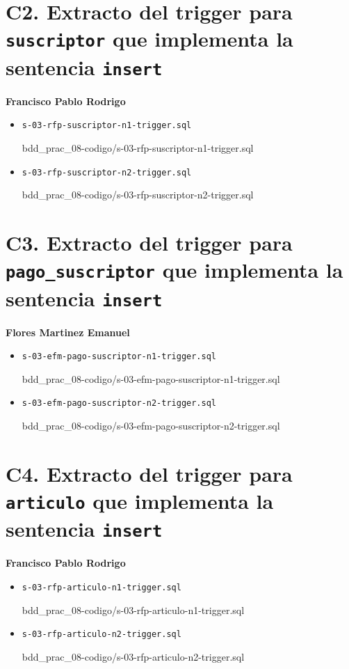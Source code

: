 \documentclass{article}
\newcommand{\codedir}{bdd_prac_08-codigo}
\begin{document}
\section*{C2. Extracto del trigger para \texttt{suscriptor} que implementa la 
sentencia \texttt{insert}}
\textbf{Francisco Pablo Rodrigo}
\begin{itemize}
  \item \texttt{s-03-rfp-suscriptor-n1-trigger.sql}
  
  {\codedir/s-03-rfp-suscriptor-n1-trigger.sql}

  \item \texttt{s-03-rfp-suscriptor-n2-trigger.sql}
  
  {\codedir/s-03-rfp-suscriptor-n2-trigger.sql}
\end{itemize}

\section*{C3. Extracto del trigger para \texttt{pago\_suscriptor} que 
implementa la sentencia \texttt{insert}}

\textbf{Flores Martinez Emanuel}
\begin{itemize}
  \item \texttt{s-03-efm-pago-suscriptor-n1-trigger.sql}
  
  {\codedir/s-03-efm-pago-suscriptor-n1-trigger.sql}

  \item \texttt{s-03-efm-pago-suscriptor-n2-trigger.sql}
  
  {\codedir/s-03-efm-pago-suscriptor-n2-trigger.sql}
\end{itemize}

\section*{C4. Extracto del trigger para \texttt{articulo} que 
implementa la sentencia \texttt{insert}}

\textbf{Francisco Pablo Rodrigo}
\begin{itemize}
  \item \texttt{s-03-rfp-articulo-n1-trigger.sql}
  
  {\codedir/s-03-rfp-articulo-n1-trigger.sql}

  \item \texttt{s-03-rfp-articulo-n2-trigger.sql}
  
  {\codedir/s-03-rfp-articulo-n2-trigger.sql}
\end{itemize}
\end{document}
